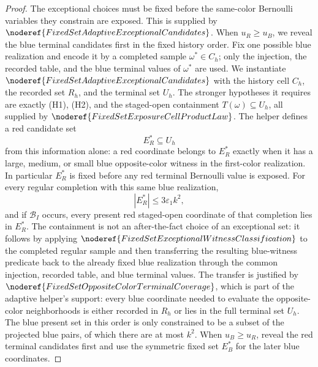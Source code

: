\begin{proof}
The exceptional choices must be fixed before the same-color Bernoulli
variables they constrain are exposed.  This is supplied by
\(\noderef{FixedSetAdaptiveExceptionalCandidates}\).  When \(u_R\ge u_B\),
we reveal the blue terminal candidates first in the fixed history order.  Fix
one possible blue realization and encode it by a completed sample
\(\omega^\ast\in C_h\); only the injection, the recorded table, and the blue
terminal values of \(\omega^\ast\) are used.  We instantiate
\(\noderef{FixedSetAdaptiveExceptionalCandidates}\) with the history cell
\(C_h\), the recorded set \(R_h\), and the terminal set \(U_h\).  The
stronger hypotheses it requires are exactly (H1), (H2), and the
staged-open containment \(T(\omega)\subseteq U_h\), all supplied by
\(\noderef{FixedSetExposureCellProductLaw}\).  The helper defines a red
candidate set
\[
E_R^\ast\subseteq U_h
\]
from this information alone: a red coordinate belongs to \(E_R^\ast\) exactly
when it has a large, medium, or small blue opposite-color witness in the
first-color realization.  In particular \(E_R^\ast\) is fixed before any red
terminal Bernoulli value is exposed.  For every regular completion with this
same blue realization,
\[
|E_R^\ast|\le 3\varepsilon_1k^2, \tag{3}
\]
and if \(\mathcal B_I\) occurs, every present red staged-open coordinate of
that completion lies in \(E_R^\ast\).  The containment is not an after-the-fact
choice of an exceptional set: it follows by applying
\(\noderef{FixedSetExceptionalWitnessClassification}\) to the completed
regular sample and then transferring the resulting blue-witness predicate
back to the already fixed blue realization through the common injection,
recorded table, and blue terminal values.  The transfer is justified by
\(\noderef{FixedSetOppositeColorTerminalCoverage}\), which is part of the
adaptive helper's support: every blue coordinate needed to evaluate the
opposite-color neighborhoods is either recorded in \(R_h\) or lies in the
full terminal set \(U_h\).  The blue present set in this order is only
constrained to be a subset of the projected blue pairs, of which there are at
most \(k^2\).  When \(u_B\ge u_R\), reveal the red terminal candidates first
and use the symmetric fixed set \(E_B^\ast\) for the later blue coordinates.


\end{proof}
